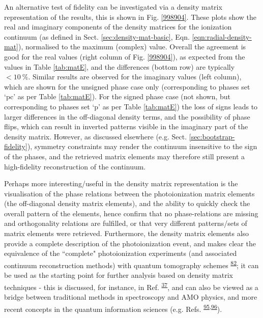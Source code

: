 \documentclass[10pt]{article}
\begin{document}
An alternative test of fidelity can be investigated via a density matrix representation of the results, this is shown in Fig. \ref{998904}. These plots show the real and imaginary components of the density matrices for the ionization continuum (as defined in Sect. \ref{sec:density-mat-basic}, Eqn. \ref{eqn:radial-density-mat}), normalised to the maximum (complex) value. Overall the agreement is good for the real values (right column of Fig. \ref{998904}), as expected from the values in Table \ref{tab:matE}, and the differences (bottom row) are typically $<10~\%$. Similar results are observed for the imaginary values (left column), which are shown for the unsigned phase case only (corresponding to phases set `pc' as per Table \ref{tab:matE}). For the signed phase case (not shown, but corresponding to phases set `p' as per Table \ref{tab:matE}) the loss of signs leads to larger differences in the off-diagonal density terms, and the possibility of phase flips, which 
can result in inverted patterns visible in the imaginary part of the density matrix. However, as discussed elsewhere (e.g. Sect. \ref{sec:bootstrap-fidelity}), symmetry constraints may render the continuum insensitive to the sign of the phases, and the retrieved matrix elements may therefore still present a high-fidelity reconstruction of the continuum.

Perhaps more interesting/useful in the density matrix representation is the visualisation of the phase relations between the photoionization matrix elements (the off-diagonal density matrix elements), and the ability to quickly check the overall pattern of the elements, hence confirm that no phase-relations are missing and orthogonality relations are fulfilled, or that very different patterns/sets of matrix elements were retrieved. Furthermore, the density matrix elements also provide a complete description of the photoionization event, and makes clear the equivalence of the ``complete" photoionization experiments (and associated continuum reconstruction methods) with quantum tomography schemes \textsuperscript{\hyperref[csl:82]{82}}; it can be used as the starting point for further analysis based on density matrix techniques - this is discussed, for instance, in Ref. \textsuperscript{\hyperref[csl:37]{37}}, and can also be viewed as a bridge between traditional methods in spectroscopy and AMO physics, and more recent concepts in the quantum information sciences (e.g. Refs.  \textsuperscript{\hyperref[csl:95]{95},\hyperref[csl:96]{96}}).
\end{document}
